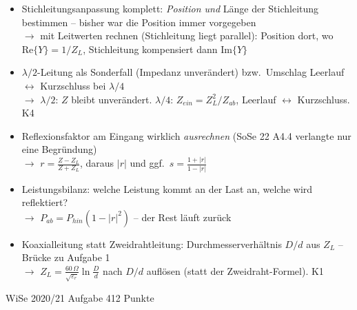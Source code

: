 \documentclass[a4paper,10pt]{article}
\newcommand{\marke}[1]{\markboth{#1}{#1}}
\newcommand{\aufgabenkopf}[3]{%
  \par\vspace{1mm}
  \noindent\colorbox{#3}{\parbox{\dimexpr\textwidth-2\fboxsep}{%
    \color{white}\sffamily\bfseries\strut\hspace{1mm}#1\hfill#2\hspace{1mm}}}%
  \par\vspace{2.5mm}}
\begin{document}
\begin{tcolorbox}[colback=A4Farbe!4, colframe=A4Farbe!55, boxrule=0.5pt, arc=1mm, left=3mm, right=2mm, top=2mm, bottom=2mm, breakable, title={\sffamily\bfseries\small Was diesmal neu drankommen könnte \normalfont\itshape\footnotesize -- eigene Prognose (keine offizielle Ankündigung): Umkehrungen, Kombinationen und Transfers zwischen den Aufgabentypen}, coltitle=white, colbacktitle=A4Farbe!70]
\sffamily\small
\begin{itemize}\setlength{\itemsep}{2.2mm}\setlength{\leftmargini}{4mm}
\item Stichleitungsanpassung komplett: \emph{Position und} Länge der Stichleitung bestimmen -- bisher war die Position immer vorgegeben\\[0.6mm] {\footnotesize\color{A4Farbe}$\rightarrow$ mit Leitwerten rechnen (Stichleitung liegt parallel): Position dort, wo $\mathrm{Re}\{Y\}=1/Z_L$, Stichleitung kompensiert dann $\mathrm{Im}\{Y\}$}
\item $\lambda/2$-Leitung als Sonderfall (Impedanz unverändert) bzw.\ Umschlag Leerlauf $\leftrightarrow$ Kurzschluss bei $\lambda/4$\\[0.6mm] {\footnotesize\color{A4Farbe}$\rightarrow$ $\lambda/2$: $Z$ bleibt unverändert. $\lambda/4$: $Z_{ein}=Z_L^2/Z_{ab}$, Leerlauf $\leftrightarrow$ Kurzschluss. K4}
\item Reflexionsfaktor am Eingang wirklich \emph{ausrechnen} (SoSe 22 A4.4 verlangte nur eine Begründung)\\[0.6mm] {\footnotesize\color{A4Farbe}$\rightarrow$ $r=\frac{Z-Z_L}{Z+Z_L}$, daraus $|r|$ und ggf.\ $s=\frac{1+|r|}{1-|r|}$}
\item Leistungsbilanz: welche Leistung kommt an der Last an, welche wird reflektiert?\\[0.6mm] {\footnotesize\color{A4Farbe}$\rightarrow$ $P_{ab}=P_{hin}(1-|r|^2)$ -- der Rest läuft zurück}
\item Koaxialleitung statt Zweidrahtleitung: Durchmesserverhältnis $D/d$ aus $Z_L$ -- Brücke zu Aufgabe 1\\[0.6mm] {\footnotesize\color{A4Farbe}$\rightarrow$ $Z_L=\frac{60\,\Omega}{\sqrt{\varepsilon_r}}\ln\frac{D}{d}$ nach $D/d$ auflösen (statt der Zweidraht-Formel). K1}
\end{itemize}\end{tcolorbox}
\clearpage
\Needspace*{182.0mm}
\marke{\color{A4Farbe}A4 \textendash{} WiSe 2020/21}
\label{auf:WiSe20x21:4}
\aufgabenkopf{WiSe 2020/21 \textendash{} Aufgabe 4}{12 Punkte}{A4Farbe}
\end{document}
